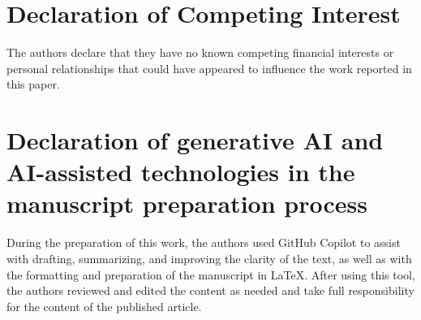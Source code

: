 \documentclass[a4paper,fleqn]{cas-sc}
\begin{document}
\section*{Declaration of Competing Interest}

The authors declare that they have no known competing financial interests or personal relationships that could have appeared to influence the work reported in this paper.







\printcredits

\section*{Declaration of generative AI and AI-assisted technologies in the manuscript preparation process}

During the preparation of this work, the authors used GitHub Copilot to assist with drafting, summarizing, and improving the clarity of the text, as well as with the formatting and preparation of the manuscript in LaTeX. After using this tool, the authors reviewed and edited the content as needed and take full responsibility for the content of the published article.

%





\end{document}
